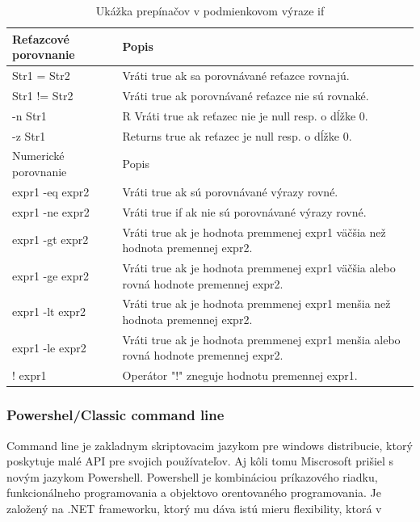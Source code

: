 \begin{table}[h!]
	\centering
	\begin{tabular}{| l | l | }
		\hline
		Reťazcové porovnanie & Popis \\
		\hline
		Str1 = Str2	& Vráti true ak sa porovnávané reťazce rovnajú. \\ 
		\hline
		Str1 != Str2 &	Vráti true ak porovnávané reťazce nie sú rovnaké.\\ 
		\hline
		-n Str1	 &R Vráti true ak reťazec nie je null resp. o dĺžke 0.\\ 
		\hline
		-z Str1	& Returns true ak reťazec je null resp. o dĺžke 0.\\
		\hline
		\hline
		Numerické porovnanie	& Popis \\
		\hline
		expr1 -eq expr2	& Vráti true ak sú porovnávané výrazy rovné. \\
		\hline
		expr1 -ne expr2	& Vráti true if ak nie sú porovnávané výrazy rovné. \\
		\hline
		expr1 -gt expr2	& Vráti true ak je hodnota premmenej expr1 väčšia než hodnota premennej expr2. \\
		\hline
		expr1 -ge expr2	& Vráti true ak je hodnota premmenej expr1 väčšia alebo rovná hodnote premennej expr2. \\
		\hline
		expr1 -lt expr2	& Vráti true ak je hodnota premmenej expr1 menšia než hodnota premennej  expr2. \\
		\hline
		expr1 -le expr2	& Vráti true ak je hodnota premmenej expr1 menšia alebo rovná hodnote premennej expr2. \\
		\hline
		! expr1	& Operátor "!" zneguje hodnotu premennej expr1. \\
		\hline
	\end{tabular}
	\caption{Ukážka prepínačov v podmienkovom výraze if \cite{shellprep}}
	\label{table:1}
	
\end{table}
\newpage

\subsubsection{Powershel/Classic command line}
\indent  
Command line je zakladnym skriptovacim jazykom pre windows distribucie, ktorý poskytuje malé API  pre svojich používateľov. Aj kôli tomu Miscrosoft prišiel s novým jazykom Powershell. Powershell je kombináciou príkazového riadku, funkcionálneho programovania a objektovo orentovaného programovania. Je založený na .NET frameworku, ktorý mu dáva istú mieru flexibility, ktorá v 

